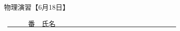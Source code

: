 \documentclass[a4paper,9pt]{jsarticle}
\begin{document}
\hakosyokika
\begin{center}
{\Large 物理演習【6月18日】}
\end{center}
\hfill ~\underline{~~~~~~番　氏名~~~~~~~~~~~~~~~~~~~~~~~~~~~~~~~~~~~}
\hakosyokika
\begin{enumerate}
    
%     
%     
%     
%     
%     
% 
\vfill
\end{enumerate}
\end{document}

